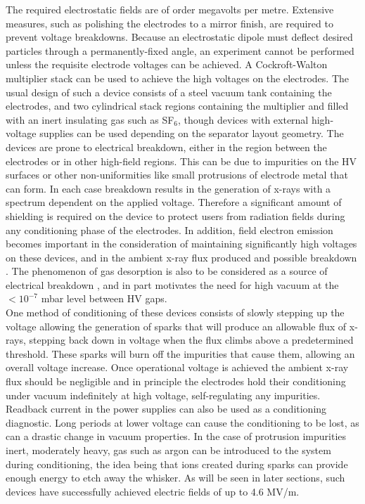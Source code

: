 The required electrostatic fields are of order megavolts per metre.  Extensive measures, such as polishing the electrodes to a mirror finish, are required to prevent voltage breakdowns.   Because an electrostatic dipole must deflect desired particles through a permanently-fixed angle,  an experiment  cannot be performed unless the requisite   electrode voltages can be achieved. A Cockroft-Walton multiplier stack can be used to achieve the high voltages on the electrodes. The usual design of such a device consists of a steel vacuum tank containing the electrodes, and two cylindrical stack regions containing the multiplier and filled  with an inert insulating gas such as SF$_{6}$, though devices with external high-voltage supplies can be used depending on the separator layout geometry. The devices are prone to electrical breakdown, either in the region between the electrodes or in other high-field regions. This can be due to impurities on the HV surfaces or other non-uniformities like small protrusions of electrode metal that can form. In each case breakdown results in the generation of x-rays with a spectrum dependent on the applied voltage. Therefore a significant amount of shielding is required on the device to protect users from radiation fields during any conditioning phase of the electrodes. In addition, field electron emission becomes important in the consideration of maintaining significantly high voltages on these devices, and in the ambient x-ray flux produced and possible breakdown \cite{Dia98a}. The phenomenon of gas desorption is also to be considered as a source of electrical breakdown \cite{Dia98b}, and in part motivates the need for high vacuum at the $<10^{-7}$ mbar level between HV gaps. 
\\
One method of conditioning of these devices consists of slowly stepping up the voltage allowing the generation of sparks that will produce an allowable flux of x-rays, stepping back down in voltage when the flux climbs above a predetermined threshold. These sparks will burn off the impurities that cause them, allowing an overall voltage increase. Once operational voltage is achieved the ambient x-ray flux should be negligible and in principle the electrodes hold their conditioning under vacuum indefinitely at high voltage, self-regulating any impurities. Readback current in the power supplies can also be used as a conditioning diagnostic. Long periods at lower voltage can cause the conditioning to be lost, as can a drastic change in vacuum properties. In the case of protrusion impurities inert, moderately heavy, gas such as argon can be introduced to the system during conditioning, the idea being that ions created during sparks can provide enough energy to etch away the whisker. As will be seen in later sections, such devices have successfully achieved electric fields of up to 4.6 MV/m.  

